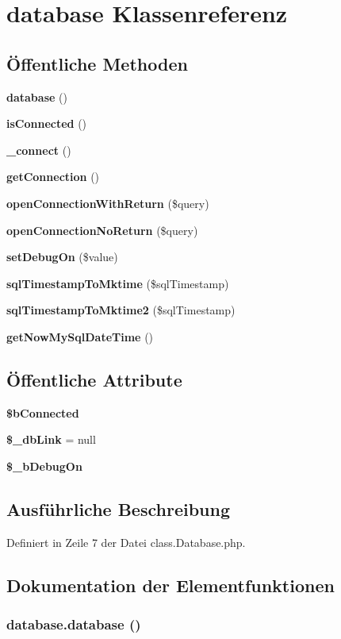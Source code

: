 \section{database Klassenreferenz}
\label{classdatabase}
\subsection*{Öffentliche Methoden}
\begin{CompactItemize}
\item 
{\bf database} ()
\item 
{\bf isConnected} ()
\item 
{\bf \_\-connect} ()
\item 
{\bf getConnection} ()
\item 
{\bf openConnectionWithReturn} (\$query)
\item 
{\bf openConnectionNoReturn} (\$query)
\item 
{\bf setDebugOn} (\$value)
\item 
{\bf sqlTimestampToMktime} (\$sqlTimestamp)
\item 
{\bf sqlTimestampToMktime2} (\$sqlTimestamp)
\item 
{\bf getNowMySqlDateTime} ()
\end{CompactItemize}
\subsection*{Öffentliche Attribute}
\begin{CompactItemize}
\item 
{\bf \$bConnected}
\item 
{\bf \$\_\-dbLink} = null
\item 
{\bf \$\_\-bDebugOn}
\end{CompactItemize}


\subsection{Ausführliche Beschreibung}


Definiert in Zeile 7 der Datei class.Database.php.

\subsection{Dokumentation der Elementfunktionen}
\subsubsection{\setlength{\rightskip}{0pt plus 5cm}database.database ()}\label{classdatabase_580b14b1ed7f304aac03ad9ae6d9b0b7}




